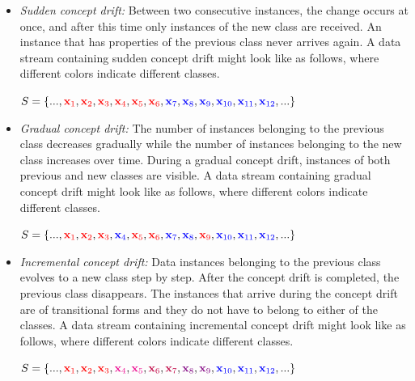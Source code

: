 \documentclass[smallcondensed]{svjour3}     %
\begin{document}
\begin{itemize}
	\item \textit{Sudden concept drift:} Between two consecutive instances, the change occurs at once, and after this time only instances of the new class are received. An instance that has properties of the previous class never arrives again. A data stream containing sudden concept drift might look like as follows, where different colors indicate different classes.
	
	$S = \{..., \textcolor{red}{\textbf{x}_1}, \textcolor{red}{\textbf{x}_2}, \textcolor{red}{\textbf{x}_3}, \textcolor{red}{\textbf{x}_4}, \textcolor{red}{\textbf{x}_5}, \textcolor{red}{\textbf{x}_6}, \textcolor{blue}{\textbf{x}_7}, \textcolor{blue}{\textbf{x}_8}, \textcolor{blue}{\textbf{x}_9}, \textcolor{blue}{\textbf{x}_{10}}, \textcolor{blue}{\textbf{x}_{11}}, \textcolor{blue}{\textbf{x}_{12}}, ... \}$
	
	\item \textit{Gradual concept drift:} The number of instances belonging to the previous class decreases gradually while the number of instances belonging to the new class increases over time. During a gradual concept drift, instances of both previous and new classes are visible. A data stream containing gradual concept drift might look like as follows, where different colors indicate different classes.
	
	$S = \{..., \textcolor{red}{\textbf{x}_1}, \textcolor{red}{\textbf{x}_2}, \textcolor{red}{\textbf{x}_3}, \textcolor{blue}{\textbf{x}_4}, \textcolor{red}{\textbf{x}_5}, \textcolor{red}{\textbf{x}_6}, \textcolor{blue}{\textbf{x}_7}, \textcolor{blue}{\textbf{x}_8}, \textcolor{red}{\textbf{x}_9}, \textcolor{blue}{\textbf{x}_{10}}, \textcolor{blue}{\textbf{x}_{11}}, \textcolor{blue}{\textbf{x}_{12}}, ... \}$
	
	\item \textit{Incremental concept drift:} Data instances belonging to the previous class evolves to a new class step by step. After the concept drift is completed, the previous class disappears. The instances that arrive during the concept drift are of transitional forms and they do not have to belong to either of the classes. A data stream containing incremental concept drift might look like as follows, where different colors indicate different classes.
	
	$S = \{..., \textcolor{red}{\textbf{x}_1}, \textcolor{red}{\textbf{x}_2}, \textcolor{red}{\textbf{x}_3}, \textcolor{magenta}{\textbf{x}_4}, \textcolor{magenta}{\textbf{x}_5}, \textcolor{purple}{\textbf{x}_6}, \textcolor{purple}{\textbf{x}_7}, \textcolor{violet}{\textbf{x}_8}, \textcolor{violet}{\textbf{x}_9}, \textcolor{blue}{\textbf{x}_{10}}, \textcolor{blue}{\textbf{x}_{11}}, \textcolor{blue}{\textbf{x}_{12}}, ... \}$
	

\end{itemize}
\end{document}
